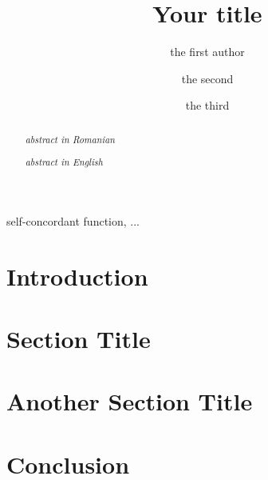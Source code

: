 \documentclass[12pt,twoside,a4paper,reqno]{amsart}
\title{Your title}
\author{the first author}
\author{the second}
\author{the third}
\begin{document}
\pagestyle{headings}
\maketitle


\begin{abstract}
{\it abstract in Romanian}

\mm \mm

{\it \quad\qu abstract in English}
\end{abstract}

\begin{Keywords}
self-concordant function, ...
\end{Keywords}


\section{Introduction}
\label{sec:intro}


\section{Section Title}
\label{sec:section}


\section{Another Section Title}
\label{sec:another-section}


\section{Conclusion}
\label{sec:conclusion}


\bigskip





%
%
%
%
%
%
\end{document}
